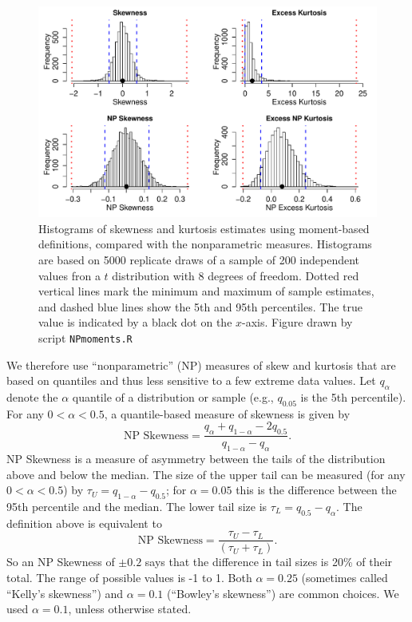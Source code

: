 \documentclass[12pt]{article}
\newcounter{box}
\newcommand{\be}{\begin{equation}}
\newcommand{\ee}{\end{equation}}
\begin{document}
\begin{figure}[tbp]
\centering
\includegraphics[width=\textwidth]{figures/NPmoments.pdf}
\caption{Histograms of skewness and kurtosis estimates using moment-based definitions, compared with the nonparametric measures. 
Histograms are based on 5000 replicate draws of a sample of 200 independent values fron a $t$ distribution with 8 degrees of freedom. 
Dotted red vertical lines mark the minimum and maximum of sample estimates, and dashed blue lines show the 5th and 95th percentiles. 
The true value is indicated by a black dot on the $x$-axis.
Figure drawn by script \texttt{NPmoments.R}}
\label{fig:NPmoments}
\end{figure} 

We therefore use ``nonparametric'' (NP) measures of skew and kurtosis that are based on quantiles and thus less sensitive to a few extreme data values. 
Let $q_\alpha$ denote the $\alpha$ quantile of a distribution or sample (e.g., $q_{0.05}$ is the 5th percentile). 
For any $0 < \alpha < 0.5$, a quantile-based measure of skewness is given by \citep{mcgillivray-1986}
\be
\mbox{NP Skewness} = \frac{q_\alpha + q_{1-\alpha} - 2 q_{0.5}}{q_{1-\alpha} - q_\alpha}.
\ee
NP Skewness is a measure of asymmetry between the tails of the distribution above and below the median. 
The size of the upper tail can be measured (for any $0 < \alpha < 0.5$) by $\tau_U = q_{1-\alpha} - q_{0.5}$; for $\alpha=0.05$ this is the difference
between the 95th percentile and the median. 
The lower tail size is $\tau_L = q_{0.5} - q_\alpha$. The definition above is equivalent to  
\be
\mbox{NP Skewness} = \frac{\tau_U - \tau_L}{(\tau_U + \tau_L)}.
\label{eqn:NPskew}
\ee
So an NP Skewness of $\pm 0.2$ says that the difference in tail sizes is 20\% of their total. 
The range of possible values is -1 to 1. Both $\alpha=0.25$ (sometimes called ``Kelly's skewness'') and $\alpha=0.1$ (``Bowley's skewness'') are common choices. 
We used $\alpha=0.1$, unless otherwise stated.  
 
\end{document}
